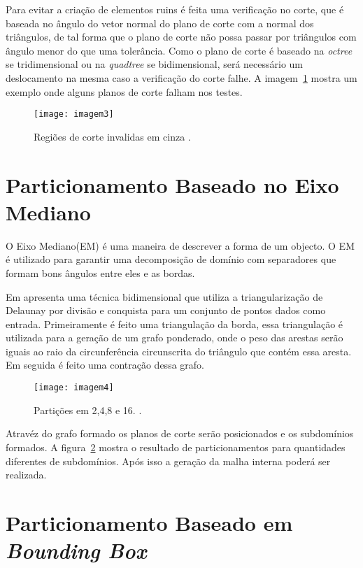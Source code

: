 Para evitar a criação de elementos ruins é feita uma verificação no corte, que é baseada no ângulo do vetor normal do plano de corte com a normal dos triângulos, de tal forma que o plano de corte não possa passar por triângulos com ângulo menor do que uma tolerância. Como o plano de corte é baseado na \textit{octree} se tridimensional ou na \textit{quadtree} se bidimensional, será necessário um deslocamento na mesma caso a verificação do corte falhe. A imagem~\ref{fig:imagem3} mostra um exemplo onde alguns planos de corte falham nos testes.

 \begin{figure}[htbp]
     \centering
     \texttt{[image: imagem3]}
     \caption{Regiões de corte invalidas em cinza \citet{bib:Larwood03}.}
     \label{fig:imagem3}
 \end{figure}

\section{Particionamento Baseado no Eixo Mediano}

O Eixo Mediano(EM) é uma maneira de descrever a forma de um objecto. O EM é utilizado para garantir uma decomposição de domínio com separadores que formam bons ângulos entre eles e as bordas. 

Em \citet{bib:Leonidas06} apresenta uma técnica bidimensional que utiliza a triangularização de Delaunay por divisão e conquista para um conjunto de pontos dados como entrada. Primeiramente é feito uma triangulação da borda, essa triangulação é utilizada para a geração de um grafo ponderado, onde o peso das arestas serão iguais ao raio da circunferência circunscrita do triângulo que contém essa aresta. Em seguida é feito uma contração dessa grafo. 

 \begin{figure}[htbp]
     \centering
     \texttt{[image: imagem4]}
     \caption{Partições em 2,4,8 e 16. \citet{bib:Leonidas06}.}
     \label{fig:imagem4}
 \end{figure}

Atravéz do grafo formado os planos de corte serão posicionados e os subdomínios formados. A figura~\ref{fig:imagem4} mostra o resultado de particionamentos para quantidades diferentes de subdomínios. Após isso a geração da malha interna poderá ser realizada.

\section{Particionamento Baseado em \textit{Bounding Box}}

